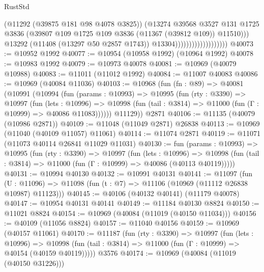 \begin{lexlean}{RustStd}
\begin{coremodule}
                                            (@11292 (@39875 @181 @98 @4078 @3825))
                                            (@13274
                                              @39568
                                              @3527
                                              @131
                                              @1725
                                              @3836
                                              (@39807
                                                @109
                                                @1725
                                                @109
                                                @3836
                                                (@11367 (@39812 @109))
                                                @11510)))
                                          @13292
                                          (@11408 (@13297 @50 @2857 @1743))
                                          @13304)))))))))))))))))))
@40073 := @10952 @1992
@40077 := @10954 (@10958 @1992) (@10964 @1992)
@40078 := @10983 @1992
@40079 := @10973 @40078
@40081 := @10969 (@40079 @10988)
@40083 := @11011 (@11012 @1992)
@40084 := @11007 @40083
@40086 := @10969 (@40084 @11036)
@40103 := @10968
    (fun (fn : @89) =>
    @40081
      (@10991
        (@10994
          (fun (params : @10993) =>
          @10995
            (fun (rty : @3390) =>
            @10997
              (fun (lets : @10996) =>
              @10998 (fun (tail : @3814) => @11000 (fun (Γ : @10999) => @40086 @11083))))))
        @11129))
    @2871
@40106 := @11135 (@40079 (@10986 @2871))
@40109 := @11048 (@11049 @2871) @26838
@40113 := @10969 (@11040 (@40109 @11057) @11061)
@40114 := @11074 @2871
@40119 := @11071 (@11073 @40114 @26841 @11029 @11031)
@40130 := fun (params : @10993) =>
  @10995
    (fun (rty : @3390) =>
    @10997
      (fun (lets : @10996) =>
      @10998 (fun (tail : @3814) => @11000 (fun (Γ : @10999) => @40086 (@40113 @40119)))))
@40131 := @10994 @40130
@40132 := @10991 @40131
@40141 := @11097
    (fun (U : @11096) => @11098 (fun (t : @7) => @11106 (@10969 (@11112 @26838 @10987) @11123)))
@40145 := @40106 (@40132 @40141) (@11179 @40078)
@40147 := @10954 @40131 @40141
@40149 := @11184 @40130 @8824
@40150 := @11021 @8824
@40154 := @10969 (@40084 (@11019 (@40150 @11034)))
@40156 := @40109 (@11056 @8824)
@40157 := @11040 @40156
@40159 := @10969 (@40157 @11061)
@40170 := @11187
    (fun (rty : @3390) =>
    @10997
      (fun (lets : @10996) =>
      @10998 (fun (tail : @3814) => @11000 (fun (Γ : @10999) => @40154 (@40159 @40119)))))
    @3576
@40174 := @10969 (@40084 (@11019 (@40150 @31226)))

\end{coremodule}
\end{lexlean}
